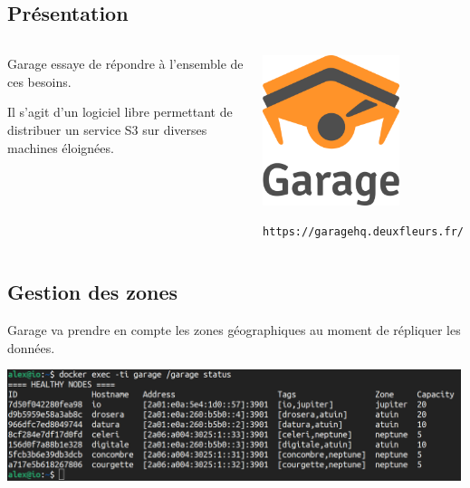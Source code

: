 \documentclass[11pt, aspectratio=1610]{beamer}
\begin{document}
\subsection{Présentation}
\begin{frame}
\begin{columns}
\begin{center}
Garage essaye de répondre à l'ensemble de ces besoins.\linebreak

\vspace{0.5cm}
Il s'agit d'un logiciel libre permettant de distribuer un service S3 sur diverses machines éloignées.
\end{center}
\begin{center}
\includegraphics[width=4cm]{garage-logo.png}\linebreak

\texttt{https://garagehq.deuxfleurs.fr/}
\end{center}
\end{columns}
\end{frame}

\subsection{Gestion des zones}
\begin{frame}
\begin{center}
Garage va prendre en compte les zones géographiques au moment de répliquer les données.\linebreak

\vspace{1cm}
\includegraphics[width=13.25cm]{zones.png}
\end{center}
\end{frame}
\end{document}
